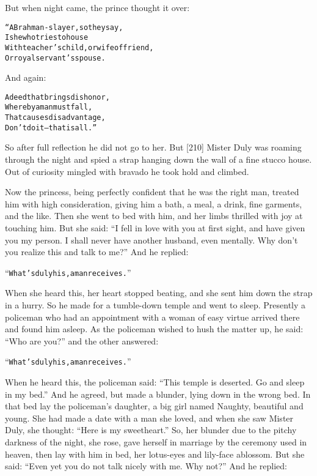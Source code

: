 \documentclass{article}
\renewenvironment{verbatim}{\begin{alltt}\normalfont\begin{centering}}{\end{centering}\end{alltt}}
\begin{document}
But when night came, the prince thought it over:

\begin{verbatim}
“A Brahman-slayer, so they say,
    Is he who tries to house
With teacher's child, or wife of friend,
    Or royal servant's spouse.
\end{verbatim}
And again:

\begin{verbatim}
A deed that brings dishonor,
    Whereby a man must fall,
That causes disadvantage,
    Don't do it--that is all.”
\end{verbatim}
So after full reflection he did not go to her. But [210] Mister
Duly was roaming through the night and spied a strap hanging down
the wall of a fine stucco house. Out of curiosity mingled with
bravado he took hold and climbed.

Now the princess, being perfectly confident that he was the right
man, treated him with high consideration, giving him a bath, a
meal, a drink, fine garments, and the like. Then she went to bed
with him, and her limbs thrilled with joy at touching him. But she
said:
``I fell in love with you at first sight, and have given you my person. I shall never have another husband, even mentally. Why don't you realize this and talk to me?''
And he replied:

\begin{verbatim}
“What's duly his, a man receives.”
\end{verbatim}
When she heard this, her heart stopped beating, and she sent him
down the strap in a hurry. So he made for a tumble-down temple and
went to sleep. Presently a policeman who had an appointment with a
woman of easy virtue arrived there and found him asleep. As the
policeman wished to hush the matter up, he said: ``Who are you?''
and the other answered:

\begin{verbatim}
“What's duly his, a man receives.”
\end{verbatim}
When he heard this, the policeman said:
``This temple is deserted. Go and sleep in my bed.'' And he agreed,
but made a blunder, lying down in the wrong bed. In that bed lay
the policeman's daughter, a big girl named Naughty, beautiful and
young. She had made a date with a man she loved, and when she saw
Mister Duly, she thought: ``Here is my sweetheart.'' So, her
blunder due to the pitchy darkness of the night, she rose, gave
herself in marriage by the ceremony used in heaven, then lay with
him in bed, her lotus-eyes and lily-face ablossom. But she said:
``Even yet you do not talk nicely with me. Why not?'' And he
replied:
\end{document}
